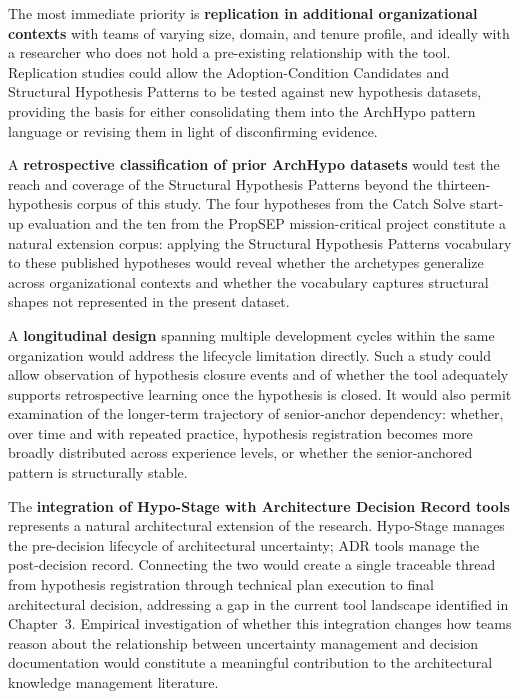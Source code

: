 The most immediate priority is \textbf{replication in additional organizational contexts} 
with teams of varying size, domain, and tenure profile, and ideally with a researcher who does not hold a
pre-existing relationship with the tool. Replication studies could allow the
Adoption-Condition Candidates and Structural Hypothesis Patterns to be tested against new hypothesis datasets, providing the basis for
either consolidating them into the ArchHypo pattern language \citep{silva2024patterns}
or revising them in light of disconfirming evidence.

A \textbf{retrospective classification of prior ArchHypo datasets} would test the
reach and coverage of the Structural Hypothesis Patterns beyond the
thirteen-hypothesis corpus of this study. The four hypotheses from the Catch Solve
start-up evaluation \citep{silva2024ieeesw} and the ten from the PropSEP
mission-critical project \citep{silva2024tse} constitute a natural extension
corpus: applying the Structural Hypothesis Patterns vocabulary to these published
hypotheses would reveal whether the archetypes generalize across organizational
contexts and whether the vocabulary captures structural shapes not represented in
the present dataset.

A \textbf{longitudinal design} spanning multiple development cycles within the same
organization would address the lifecycle limitation directly. Such a study could allow
observation of hypothesis closure events and of whether the tool adequately supports retrospective learning once the
hypothesis is closed. It would also permit examination of the longer-term trajectory of
senior-anchor dependency: whether, over time and with repeated practice, hypothesis
registration becomes more broadly distributed across experience levels, or whether the
senior-anchored pattern is structurally stable.

The \textbf{integration of Hypo-Stage with Architecture Decision Record tools} represents a natural architectural extension of the research. 
Hypo-Stage manages the pre-decision lifecycle of architectural uncertainty; ADR tools manage the
post-decision record. Connecting the two would create a single traceable thread from
hypothesis registration through technical plan execution to final architectural decision,
addressing a gap in the current tool landscape identified in Chapter~3. Empirical
investigation of whether this integration changes how teams reason about the
relationship between uncertainty management and decision documentation would
constitute a meaningful contribution to the architectural knowledge management literature.

